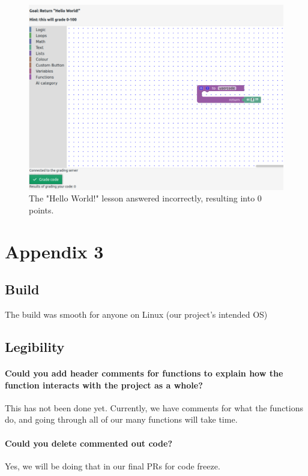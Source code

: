 \documentclass[draftclsnofoot,10pt,onecolumn]{IEEEtran}
\begin{document}
\begin{figure}[h]
    \centering
    \includegraphics[width=\textwidth]{caps11}
    \caption{The "Hello World!" lesson answered incorrectly, resulting into 0 points.}
\end{figure}

\clearpage
\section{Appendix 3}%
\subsection{Build}
The build was smooth for anyone on Linux (our project's intended OS)
\subsection{Legibility}
\paragraph{Could you add header comments for functions to explain how the function interacts with the project as a whole?}
This has not been done yet. Currently, we have comments for what the functions do, and going through all of our many functions will take time.
\paragraph{Could you delete commented out code?}
Yes, we will be doing that in our final PRs for code freeze.
\end{document}

